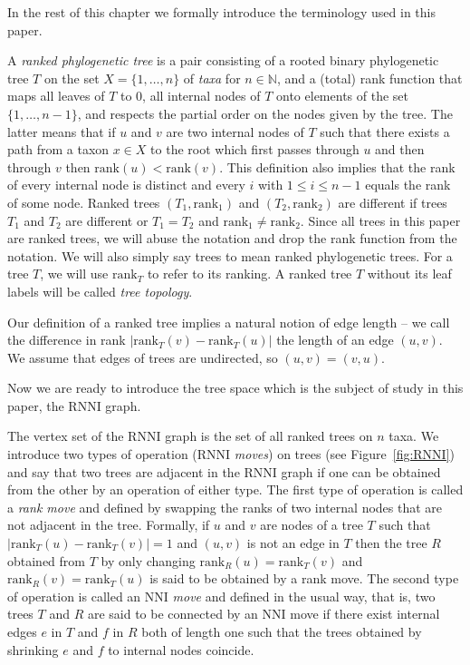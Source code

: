 \documentclass{amsart}
\newcommand{\rank}{\mathrm{rank}}
\newcommand{\nni}{\mathrm{NNI}}
\newcommand{\rnni}{\mathrm{RNNI}}
\begin{document}
In the rest of this chapter we formally introduce the terminology used in this paper.

A \emph{ranked phylogenetic tree} is a pair consisting of a rooted binary phylogenetic tree $T$ on the set $X = \{1, \ldots, n\}$ of \emph{taxa} for $n \in \mathbb N$, and a (total) rank function that maps all leaves of $T$ to $0$, all internal nodes of $T$ onto elements of the set $\{1, \ldots, n-1\}$, and respects the partial order on the nodes given by the tree.
The latter means that if $u$ and $v$ are two internal nodes of $T$ such that there exists a path from a taxon $x \in X$ to the root which first passes through $u$ and then through $v$ then $\rank(u) < \rank(v)$.
This definition also implies that the rank of every internal node is distinct and every $i$ with $1 \leq i \leq n-1$ equals the rank of some node.
Ranked trees $(T_1, \rank_1)$ and $(T_2, \rank_2)$ are different if trees $T_1$ and $T_2$ are different or $T_1 = T_2$ and $\rank_1 \neq \rank_2$.
Since all trees in this paper are ranked trees, we will abuse the notation and drop the rank function from the notation.
We will also simply say trees to mean ranked phylogenetic trees.
For a tree $T$, we will use $\rank_T$ to refer to its ranking.
A ranked tree $T$ without its leaf labels will be called \emph{tree topology}.

Our definition of a ranked tree implies a natural notion of edge length -- we call the difference in rank $|\rank_T(v) - \rank_T(u)|$ the length of an edge $(u, v)$.
We assume that edges of trees are undirected, so $(u, v) = (v, u)$.

Now we are ready to introduce the tree space which is the subject of study in this paper, the $\rnni$ graph.

The vertex set of the $\rnni$ graph is the set of all ranked trees on $n$ taxa.
We introduce two types of operation ($\rnni$ \emph{moves}) on trees (see Figure~\ref{fig:RNNI}) and say that two trees are adjacent in the $\rnni$ graph if one can be obtained from the other by an operation of either type.
The first type of operation is called a \emph{rank move} and defined by swapping the ranks of two internal nodes that are not adjacent in the tree.
Formally, if $u$ and $v$ are nodes of a tree $T$ such that $|\rank_T(u) - \rank_T(v)| = 1$ and $(u, v)$ is not an edge in $T$ then the tree $R$ obtained from $T$ by only changing $\rank_R(u) = \rank_T(v)$ and $\rank_R(v) = \rank_T(u)$ is said to be obtained by a rank move.
The second type of operation is called an $\nni$ \emph{move} and defined in the usual way, that is, two trees $T$ and $R$ are said to be connected by an $\nni$ move if there exist internal edges $e$ in $T$ and $f$ in $R$ both of length one such that the trees obtained by shrinking $e$ and $f$ to internal nodes coincide.
\end{document}
